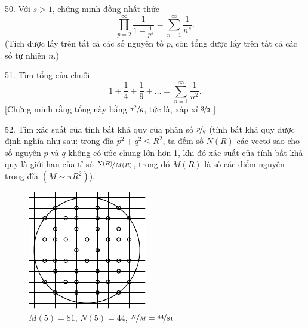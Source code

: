 \begin{problem}{50.}
	Với $s>1$, chứng minh đồng nhất thức
	\begin{equation*}
		\textstyle\prod\limits_{p=2}^{\infty} \frac{1}{1-\frac{1}{p^s}}=\textstyle\sum\limits_{n=1}^{\infty} \frac{1}{n^s}.
	\end{equation*}
	(Tích được lấy trên tất cả các số nguyên tố $p$, còn tổng được lấy trên tất cả các số tự nhiên $n$.)
\end{problem}

\begin{problem}{51.}
	Tìm tổng của chuỗi
	\begin{equation*}
		1+ \frac{1}{4}+ \frac{1}{9}+\dots=\textstyle\sum\limits_{n=1}^{\infty} \frac{1}{n^2}.
	\end{equation*}
	[Chứng minh rằng tổng này bằng $\nicefrac{\pi^2}{6}$, tức là, xấp xỉ $\nicefrac{3}{2}$.]
\end{problem}

\begin{problem}{52.}
	Tìm xác suất của tính bất khả quy của phân số $\nicefrac{p}{q}$ (tính bất khả quy được định nghĩa như sau: trong đĩa $p^2+q^2 \leqslant R^2$, ta đếm số $N(R)$ các vectơ sao cho số nguyên $p$ và $q$ không có ước chung lớn hơn 1, khi đó xác suất của tính bất khả quy là giới hạn của tỉ số $\nicefrac{N(R)}{M(R)}$, trong đó $M(R)$ là số các điểm nguyên trong đĩa $(M\sim \pi R^2)$).
	\begin{figure}
		\includegraphics{taskbook-36}\\
		\footnotesize $M(5)=81$, $N(5)=44$, $\nicefrac{N}{M} = \nicefrac{44}{81}$
	\end{figure}
\end{problem}

